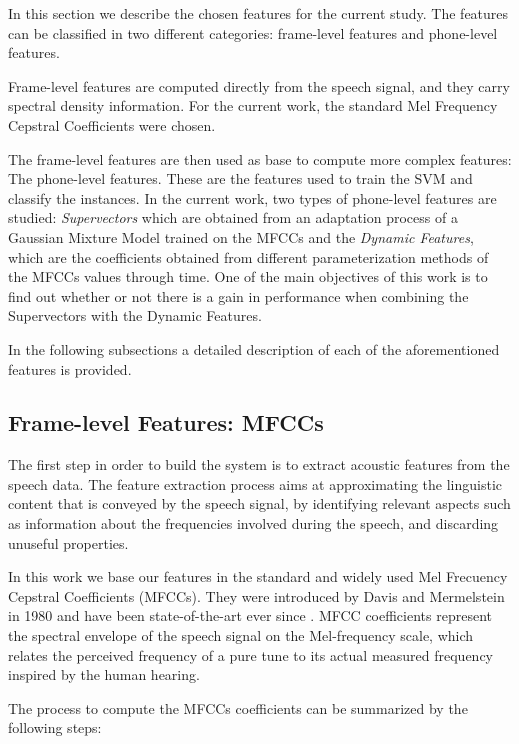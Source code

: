 In this section we describe the chosen features for the current study. The features can be classified in two different categories: frame-level features and
phone-level features.

Frame-level features are computed directly from the speech signal, and they carry spectral density information. For the current work, the standard Mel Frequency Cepstral Coefficients
were chosen.

The frame-level features are then used as base to compute more complex features:
The phone-level features. These
are the features used to train the SVM and classify the instances. In the current work, two
types of phone-level features are studied: \textit{Supervectors}
which are obtained from an adaptation process of
a Gaussian Mixture Model trained on the MFCCs and the \textit{Dynamic Features},
which are
the coefficients obtained from different parameterization methods of the MFCCs values through time.
One of the main objectives of this work is to find out whether or not there is a gain in performance
when combining the Supervectors with the Dynamic Features.

In the following subsections a detailed description of each of the aforementioned features is
provided.

\subsection{Frame-level Features: MFCCs}

The first step in order to build the system is to extract acoustic features from the speech data.
The feature extraction process aims at approximating the linguistic content that is conveyed
by the speech signal, by identifying relevant aspects such as information about
the frequencies involved during the speech, and discarding unuseful properties.

In this work we base our features in the standard and widely used Mel Frecuency
Cepstral Coefficients (MFCCs). They were introduced by Davis and Mermelstein in 1980 and
have been state-of-the-art ever since \cite{mfcc_foundational}.
MFCC coefficients represent the spectral envelope of the speech signal on the Mel-frequency scale,
which relates the perceived frequency of a pure tune to its actual measured frequency inspired
by the human hearing.

The process to compute the MFCCs coefficients can be summarized by the following steps:

